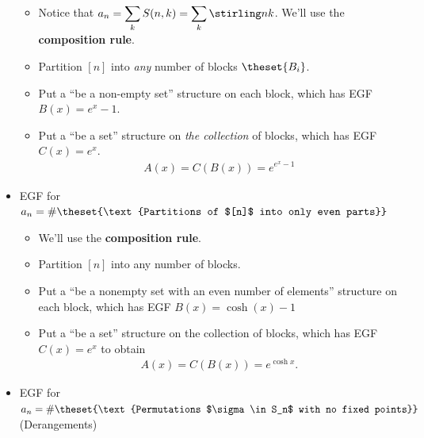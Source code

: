\begin{itemize}
  \begin{itemize}
  \tightlist
  \item
    Notice that
    \(a_n = \displaystyle\sum_k S(n, k) = \displaystyle\sum_k \stirling n k\).
    We'll use the \textbf{composition rule}.
  \item
    Partition \([n]\) into \emph{any} number of blocks \(\theset{B_i}\).
  \item
    Put a ``be a non-empty set'' structure on each block, which has EGF
    \(B(x) = e^x - 1\).
  \item
    Put a ``be a set'' structure on \emph{the collection} of blocks,
    which has EGF \(C(x) = e^x\).
    \begin{align*}
    A(x) = C(B(x)) = e^{e^x - 1}
    \end{align*}
  \end{itemize}
\item
  EGF for
  \(a_n = \#\theset{\text{Partitions of $[n]$ into only even parts}}\)

  \begin{itemize}
  \tightlist
  \item
    We'll use the \textbf{composition rule}.
  \item
    Partition \([n]\) into any number of blocks.
  \item
    Put a ``be a nonempty set with an even number of elements''
    structure on each block, which has EGF \(B(x) = \cosh(x) -1\)
  \item
    Put a ``be a set'' structure on the collection of blocks, which has
    EGF \(C(x) = e^x\) to obtain
    \begin{align*}
    A(x) = C(B(x)) = e^{\cosh x}.
    \end{align*}
  \end{itemize}
\item
  EGF for
  \(a_n = \#\theset{\text{Permutations $\sigma \in S_n$ with no fixed points}}\)
  (Derangements)


\end{itemize}

